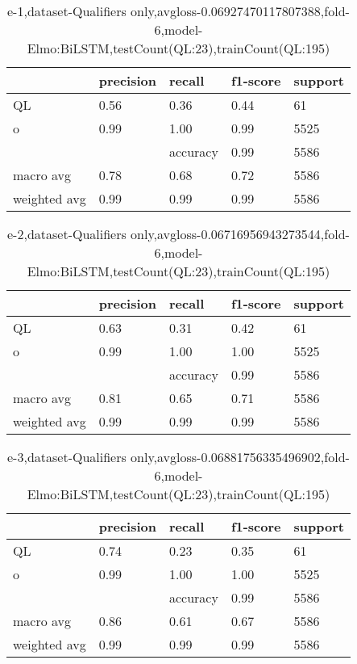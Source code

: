 \begin{table}[!ht] 
\centering
\caption{e-1,dataset-Qualifiers only,avgloss-0.06927470117807388,fold-6,model-Elmo:BiLSTM,testCount(QL:23),trainCount(QL:195)}\label{e-1data-qualS.tsv}
\begin{tabularx}{300pt}{|X|X|X|X|X|}
\hline
&precision&recall&f1-score&support\\
\hline
QL&0.56&0.36&0.44&61\\
\hline
o&0.99&1.00&0.99&5525\\
\hline
&&accuracy&0.99&5586\\
\hline
macro avg&0.78&0.68&0.72&5586\\
\hline
weighted avg&0.99&0.99&0.99&5586\\
\hline
\end{tabularx}
\end{table}
\begin{table}[!ht] 
\centering
\caption{e-2,dataset-Qualifiers only,avgloss-0.06716956943273544,fold-6,model-Elmo:BiLSTM,testCount(QL:23),trainCount(QL:195)}\label{e-2data-qualS.tsv}
\begin{tabularx}{300pt}{|X|X|X|X|X|}
\hline
&precision&recall&f1-score&support\\
\hline
QL&0.63&0.31&0.42&61\\
\hline
o&0.99&1.00&1.00&5525\\
\hline
&&accuracy&0.99&5586\\
\hline
macro avg&0.81&0.65&0.71&5586\\
\hline
weighted avg&0.99&0.99&0.99&5586\\
\hline
\end{tabularx}
\end{table}
\begin{table}[!ht] 
\centering
\caption{e-3,dataset-Qualifiers only,avgloss-0.06881756335496902,fold-6,model-Elmo:BiLSTM,testCount(QL:23),trainCount(QL:195)}\label{e-3data-qualS.tsv}
\begin{tabularx}{300pt}{|X|X|X|X|X|}
\hline
&precision&recall&f1-score&support\\
\hline
QL&0.74&0.23&0.35&61\\
\hline
o&0.99&1.00&1.00&5525\\
\hline
&&accuracy&0.99&5586\\
\hline
macro avg&0.86&0.61&0.67&5586\\
\hline
weighted avg&0.99&0.99&0.99&5586\\
\hline
\end{tabularx}
\end{table}
